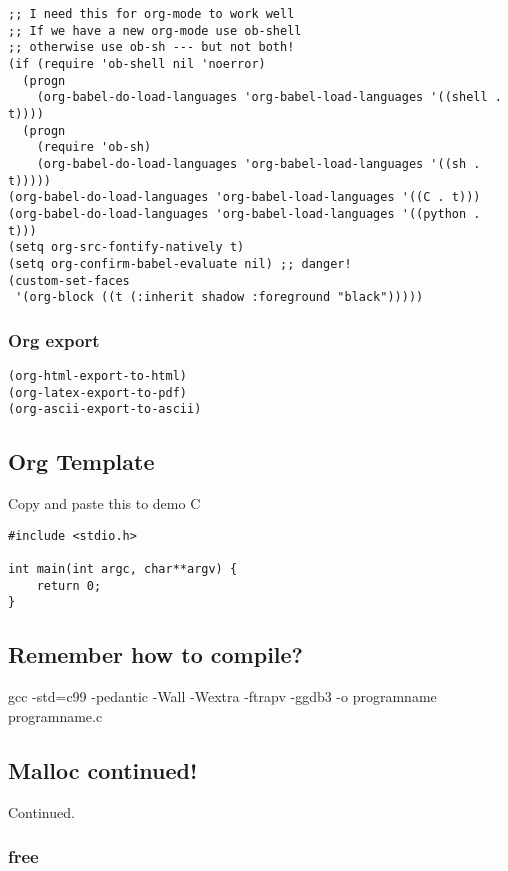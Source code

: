 \documentclass[11pt]{article}
\begin{document}
\begin{verbatim}
;; I need this for org-mode to work well
;; If we have a new org-mode use ob-shell
;; otherwise use ob-sh --- but not both!
(if (require 'ob-shell nil 'noerror)
  (progn
    (org-babel-do-load-languages 'org-babel-load-languages '((shell . t))))
  (progn
    (require 'ob-sh)
    (org-babel-do-load-languages 'org-babel-load-languages '((sh . t)))))
(org-babel-do-load-languages 'org-babel-load-languages '((C . t)))
(org-babel-do-load-languages 'org-babel-load-languages '((python . t)))
(setq org-src-fontify-natively t)
(setq org-confirm-babel-evaluate nil) ;; danger!
(custom-set-faces
 '(org-block ((t (:inherit shadow :foreground "black")))))
\end{verbatim}

\subsubsection{Org export}
\label{sec:orgb693fbe}
\begin{verbatim}
(org-html-export-to-html)
(org-latex-export-to-pdf)
(org-ascii-export-to-ascii)
\end{verbatim}

\subsection{Org Template}
\label{sec:org84cd6a3}
Copy and paste this to demo C

\begin{verbatim}
#include <stdio.h>

int main(int argc, char**argv) {
    return 0;
}
\end{verbatim}

\subsection{Remember how to compile?}
\label{sec:org0d921ed}

gcc  -std=c99 -pedantic -Wall -Wextra -ftrapv -ggdb3 -o programname programname.c

\subsection{Malloc continued!}
\label{sec:org9ba1fdf}

Continued.

\subsubsection{free}
\label{sec:orgc793e9e}
\end{document}
